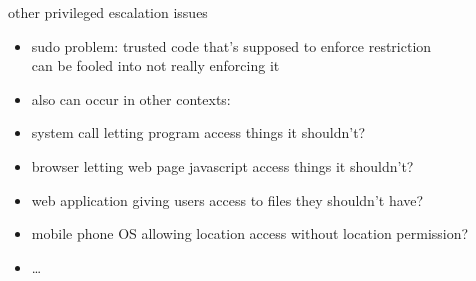 \begin{frame}{other privileged escalation issues}
    \begin{itemize}
    \item sudo problem: trusted code that's supposed to enforce restriction \\
        can be fooled into not really enforcing it
    \item also can occur in other contexts:
    \vspace{.5cm}
    \item system call letting program access things it shouldn't?
    \item browser letting web page javascript access things it shouldn't?
    \item web application giving users access to files they shouldn't have?
    \item mobile phone OS allowing location access without location permission?
    \item \ldots
    \end{itemize}
\end{frame}
